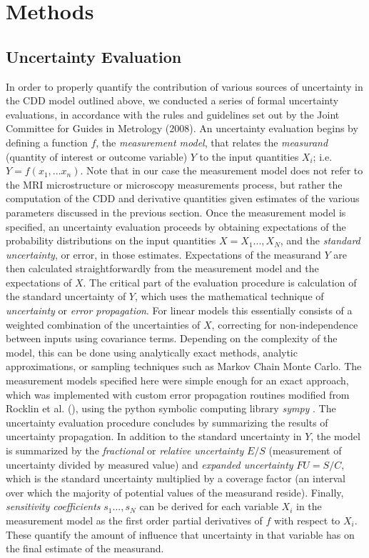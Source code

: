 
\section{Methods}

\subsection{Uncertainty Evaluation}


In order to properly quantify the contribution of various sources of uncertainty in the CDD model outlined above, we conducted a series of formal uncertainty evaluations, in accordance with the rules and guidelines set out by the Joint Committee for Guides in Metrology (2008). An uncertainty evaluation begins by defining a function $f$, the \textit{measurement model}, that relates the \textit{measurand} (quantity of interest or outcome variable) $Y$ to the input quantities $X_{i}$; i.e. $Y = f(x_{1},...x_{n})$. Note that in our case the measurement model does not refer to the MRI microstructure or microscopy measurements process, but rather the computation of the CDD and derivative quantities given estimates of the various parameters discussed in the previous section. Once the measurement model is specified,
an uncertainty evaluation proceeds by obtaining expectations of the
probability distributions on the input quantities $X=X_{1}...,X_{N}$,
and the \emph{standard uncertainty}, or error, in those estimates. Expectations of the measurand $Y$ are then calculated straightforwardly from the measurement model and the expectations of $X$. The critical
part of the evaluation procedure is calculation of the standard
uncertainty of $Y$, which uses the mathematical technique of \emph{uncertainty} or \emph{error propagation}. For linear models this essentially consists of a weighted combination of the uncertainties of $X$, correcting for non-independence between inputs using covariance terms. Depending on the complexity of the model, this can be done using
analytically exact methods, analytic approximations, or sampling techniques such as Markov Chain Monte Carlo. The measurement models specified here were simple enough for an exact approach, which was implemented with custom error propagation routines modified from Rocklin et al. (\cite{rocklin2017symbolic}), using the python symbolic computing library \textit{sympy} \cite{meurer2017sympy}. The uncertainty evaluation procedure concludes by summarizing the results of uncertainty propagation. In addition to the standard uncertainty in $Y$, the model is summarized by the \emph{fractional} or \emph{relative uncertainty} $E/S$ (measurement of uncertainty divided by measured value) and \emph{expanded uncertainty} $FU=S/C$, which is the standard uncertainty multiplied by a coverage factor (an interval over which the majority of potential values of the measurand reside). Finally, \emph{sensitivity coefficients} $s_{1}...,s_{N}$ can be derived for each variable $X_{i}$ in the measurement model as the first order partial derivatives of $f$ with respect to $X_{i}$. These quantify the amount of influence that uncertainty in that variable has on the final estimate of the measurand.



